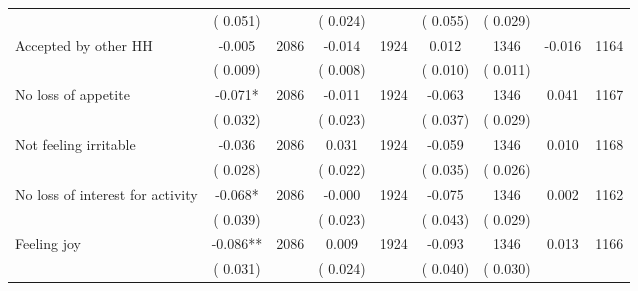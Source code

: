 \begin{tabular}{l*{8}{c}}
                       &       (       0.051)            &                               &       (       0.024)            &                               &       (       0.055)            &       (       0.029) &                  \\
Accepted by other HH        &             -0.005      &       2086       &             -0.014      &       1924       &              0.012      &       1346  &       -0.016 &       1164       \\
                       &       (       0.009)            &                               &       (       0.008)            &                               &       (       0.010)            &       (       0.011) &                  \\
No loss of appetite        &             -0.071*      &       2086       &             -0.011      &       1924       &             -0.063      &       1346  &        0.041 &       1167       \\
                       &       (       0.032)            &                               &       (       0.023)            &                               &       (       0.037)            &       (       0.029) &                  \\
Not feeling irritable        &             -0.036      &       2086       &              0.031      &       1924       &             -0.059      &       1346  &        0.010 &       1168       \\
                       &       (       0.028)            &                               &       (       0.022)            &                               &       (       0.035)            &       (       0.026) &                  \\
No loss of interest for activity        &             -0.068*      &       2086       &             -0.000      &       1924       &             -0.075      &       1346  &        0.002 &       1162       \\
                       &       (       0.039)            &                               &       (       0.023)            &                               &       (       0.043)            &       (       0.029) &                  \\
Feeling joy        &             -0.086**      &       2086       &              0.009      &       1924       &             -0.093      &       1346  &        0.013 &       1166       \\
                       &       (       0.031)            &                               &       (       0.024)            &                               &       (       0.040)            &       (       0.030) &                  \\
\hline \end{tabular}